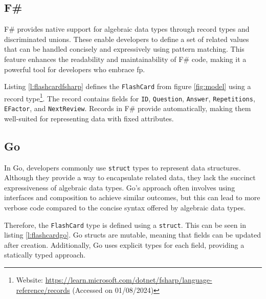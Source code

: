         \subsection*{F\#}
        F\# provides native support for algebraic data types through record types and discriminated unions. These enable developers to define a set of related values that can be handled concisely and expressively using pattern matching. This feature enhances the readability and maintainability of F\# code, making it a powerful tool for developers who embrace \ac{fp}.

        Listing \ref{l:flashcardfsharp} defines the \texttt{FlashCard} from figure \ref{fig:model} using a record type\footnote{Website: \url{https://learn.microsoft.com/dotnet/fsharp/language-reference/records} (Accessed on 01/08/2024)}. The record contains fields for \texttt{ID}, \texttt{Question}, \texttt{Answer}, \texttt{Repetitions}, \texttt{EFactor}, and \texttt{NextReview}. Records in F\# provide automatically, making them well-suited for representing data with fixed attributes.

        \subsection*{Go}
        In Go, developers commonly use \texttt{struct} types to represent data structures. Although they provide a way to encapsulate related data, they lack the succinct expressiveness of algebraic data types. Go's approach often involves using interfaces and composition to achieve similar outcomes, but this can lead to more verbose code compared to the concise syntax offered by algebraic data types.

        Therefore, the \texttt{FlashCard} type is defined using a \texttt{struct}. This can be seen in listing \ref{l:flashcardgo}. Go structs are mutable, meaning that fields can be updated after creation. Additionally, Go uses explicit types for each field, providing a statically typed approach.

